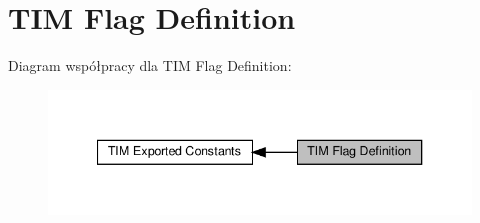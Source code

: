 \hypertarget{group___t_i_m___flag__definition}{}\section{T\+IM Flag Definition}
\label{group___t_i_m___flag__definition}
Diagram współpracy dla T\+IM Flag Definition\+:\nopagebreak
\begin{figure}[H]
\begin{center}
\leavevmode
\includegraphics[width=340pt]{group___t_i_m___flag__definition}
\end{center}
\end{figure}
